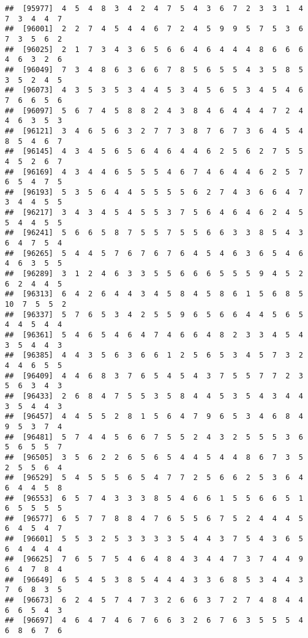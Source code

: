 \documentclass[
]{book}
\begin{document}
\begin{verbatim}
##  [95977]  4  5  4  8  3  4  2  4  7  5  4  3  6  7  2  3  3  1  4  7  3  4  4  7
##  [96001]  2  2  7  4  5  4  4  6  7  2  4  5  9  9  5  7  5  3  6  7  3  5  6  2
##  [96025]  2  1  7  3  4  3  6  5  6  6  4  6  4  4  4  8  6  6  6  4  6  3  2  6
##  [96049]  7  3  4  8  6  3  6  6  7  8  5  6  5  5  4  3  5  8  5  3  5  2  4  5
##  [96073]  4  3  5  3  5  3  4  4  5  3  4  5  6  5  3  4  5  4  6  7  6  6  5  6
##  [96097]  5  6  7  4  5  8  8  2  4  3  8  4  6  4  4  4  7  2  4  4  6  3  5  3
##  [96121]  3  4  6  5  6  3  2  7  7  3  8  7  6  7  3  6  4  5  4  8  5  4  6  7
##  [96145]  4  3  4  5  6  5  6  4  6  4  4  6  2  5  6  2  7  5  5  4  5  2  6  7
##  [96169]  4  3  4  4  6  5  5  5  4  6  7  4  6  4  4  6  2  5  7  6  5  4  7  5
##  [96193]  5  3  5  6  4  4  5  5  5  5  6  2  7  4  3  6  6  4  7  3  4  4  5  5
##  [96217]  3  4  3  4  5  4  5  5  3  7  5  6  4  6  4  6  2  4  5  5  4  4  5  5
##  [96241]  5  6  6  5  8  7  5  5  7  5  5  6  6  3  3  8  5  4  3  6  4  7  5  4
##  [96265]  5  4  4  5  7  6  7  6  7  6  4  5  4  6  3  6  5  4  6  4  6  3  5  5
##  [96289]  3  1  2  4  6  3  3  5  5  6  6  6  5  5  5  9  4  5  2  6  2  4  4  5
##  [96313]  6  4  2  6  4  4  3  4  5  8  4  5  8  6  1  5  6  8  5 10  7  5  5  2
##  [96337]  5  7  6  5  3  4  2  5  5  9  6  5  6  6  4  4  5  6  5  4  4  5  4  4
##  [96361]  5  4  6  5  4  6  4  7  4  6  6  4  8  2  3  3  4  5  4  3  5  4  4  3
##  [96385]  4  4  3  5  6  3  6  6  1  2  5  6  5  3  4  5  7  3  2  4  4  6  5  5
##  [96409]  4  4  6  8  3  7  6  5  4  5  4  3  7  5  5  7  7  2  3  5  6  3  4  3
##  [96433]  2  6  8  4  7  5  5  3  5  8  4  4  5  3  5  4  3  4  4  3  5  4  4  3
##  [96457]  4  4  5  5  2  8  1  5  6  4  7  9  6  5  3  4  6  8  4  9  5  3  7  4
##  [96481]  5  7  4  4  5  6  6  7  5  5  2  4  3  2  5  5  5  3  6  5  6  5  5  7
##  [96505]  3  5  6  2  2  6  5  6  5  4  4  5  4  4  8  6  7  3  5  2  5  5  6  4
##  [96529]  5  4  5  5  5  6  5  4  7  7  2  5  6  6  2  5  3  6  4  6  4  4  5  8
##  [96553]  6  5  7  4  3  3  3  8  5  4  6  6  1  5  5  6  6  5  1  6  5  5  5  5
##  [96577]  6  5  7  7  8  8  4  7  6  5  5  6  7  5  2  4  4  4  5  6  4  5  4  7
##  [96601]  5  5  3  2  5  3  3  3  3  5  4  4  3  7  5  4  3  6  5  6  4  4  4  4
##  [96625]  7  6  5  7  5  4  6  4  8  4  3  4  4  7  3  7  4  4  9  6  4  7  8  4
##  [96649]  6  5  4  5  3  8  5  4  4  4  3  3  6  8  5  3  4  4  3  7  6  8  3  5
##  [96673]  6  2  4  5  7  4  7  3  2  6  6  3  7  2  7  4  8  4  4  6  6  5  4  3
##  [96697]  4  6  4  7  4  6  7  6  6  3  2  6  7  6  3  5  5  5  4  6  8  6  7  6

\end{verbatim}
\end{document}
